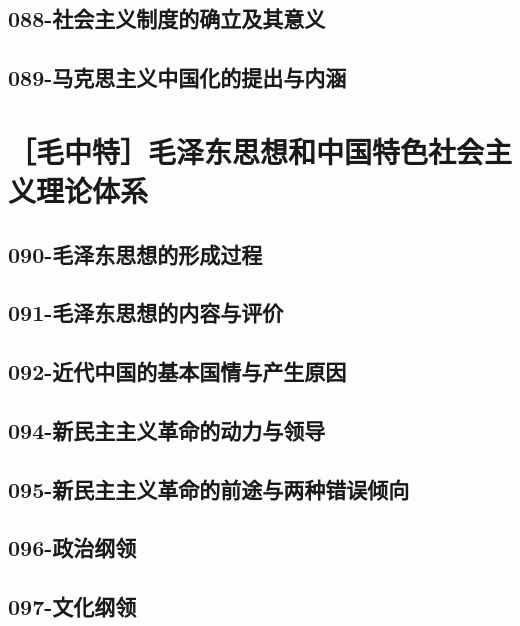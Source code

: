 \subsection{088-社会主义制度的确立及其意义}

\subsection{089-马克思主义中国化的提出与内涵}


\section{［毛中特］毛泽东思想和中国特色社会主义理论体系}

\subsection{090-毛泽东思想的形成过程}

\subsection{091-毛泽东思想的内容与评价}

\subsection{092-近代中国的基本国情与产生原因}

\subsection{094-新民主主义革命的动力与领导}

\subsection{095-新民主主义革命的前途与两种错误倾向}

\subsection{096-政治纲领}

\subsection{097-文化纲领}

